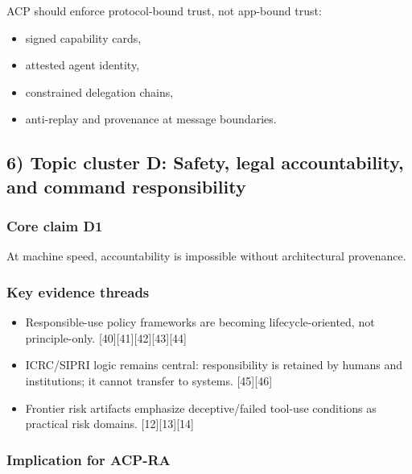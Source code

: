\documentclass[11pt]{article}
\begin{document}
ACP should enforce protocol-bound trust, not app-bound trust:

\begin{itemize}
\tightlist
\item
  signed capability cards,
\item
  attested agent identity,
\item
  constrained delegation chains,
\item
  anti-replay and provenance at message boundaries.
\end{itemize}

\hypertarget{topic-cluster-d-safety-legal-accountability-and-command-responsibility}{%
\subsection{6) Topic cluster D: Safety, legal accountability, and
command
responsibility}\label{topic-cluster-d-safety-legal-accountability-and-command-responsibility}}

\hypertarget{core-claim-d1}{%
\subsubsection{Core claim D1}\label{core-claim-d1}}

At machine speed, accountability is impossible without architectural
provenance.

\hypertarget{key-evidence-threads-3}{%
\subsubsection{Key evidence threads}\label{key-evidence-threads-3}}

\begin{itemize}
\tightlist
\item
  Responsible-use policy frameworks are becoming lifecycle-oriented, not
  principle-only. {[}40{]}{[}41{]}{[}42{]}{[}43{]}{[}44{]}
\item
  ICRC/SIPRI logic remains central: responsibility is retained by humans
  and institutions; it cannot transfer to systems. {[}45{]}{[}46{]}
\item
  Frontier risk artifacts emphasize deceptive/failed tool-use conditions
  as practical risk domains. {[}12{]}{[}13{]}{[}14{]}
\end{itemize}

\hypertarget{implication-for-acp-ra-3}{%
\subsubsection{Implication for ACP-RA}\label{implication-for-acp-ra-3}}
\end{document}
